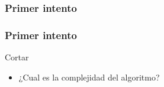 \documentclass{beamer}
\begin{document}
\begin{frame}
    \frametitle{Primer intento}
\end{frame}    

\begin{frame}
    \frametitle{Primer intento}
    \begin{algorithm}[H]
        \caption{Cortar}
        \begin{algorithmic}[1]
        \EndIf
        \EndIf
        \EndFor
        \EndProcedure
        \end{algorithmic}
    \end{algorithm}

    \begin{itemize}
        \item{¿Cual es la complejidad del algoritmo?}
    \end{itemize}
    \end{frame}
\end{document}
